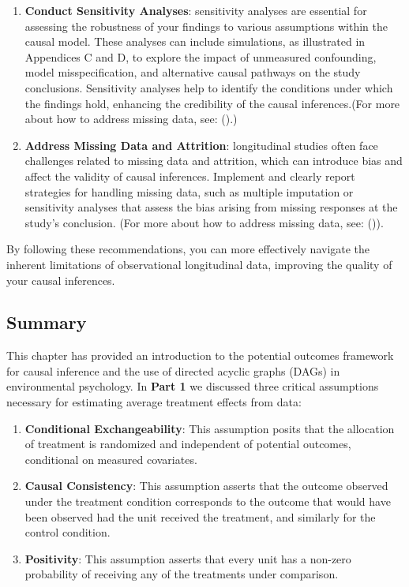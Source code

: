 \documentclass[
  singlecolumn]{article}
\providecommand{\tightlist}{%
  \setlength{\itemsep}{0pt}\setlength{\parskip}{0pt}}\usepackage{longtable,booktabs,array}
\begin{document}
\begin{enumerate}
\item
  \textbf{Conduct Sensitivity Analyses}: sensitivity analyses are
  essential for assessing the robustness of your findings to various
  assumptions within the causal model. These analyses can include
  simulations, as illustrated in Appendices C and D, to explore the
  impact of unmeasured confounding, model misspecification, and
  alternative causal pathways on the study conclusions. Sensitivity
  analyses help to identify the conditions under which the findings
  hold, enhancing the credibility of the causal inferences.(For more
  about how to address missing data, see:
  ().)
\item
  \textbf{Address Missing Data and Attrition}: longitudinal studies
  often face challenges related to missing data and attrition, which can
  introduce bias and affect the validity of causal inferences. Implement
  and clearly report strategies for handling missing data, such as
  multiple imputation or sensitivity analyses that assess the bias
  arising from missing responses at the study's conclusion. (For more
  about how to address missing data, see:
  ()).
\end{enumerate}

By following these recommendations, you can more effectively navigate
the inherent limitations of observational longitudinal data, improving
the quality of your causal inferences.

\subsection{Summary}\label{summary}

This chapter has provided an introduction to the potential outcomes
framework for causal inference and the use of directed acyclic graphs
(DAGs) in environmental psychology. In \textbf{Part 1} we discussed
three critical assumptions necessary for estimating average treatment
effects from data:

\begin{enumerate}
\def\labelenumi{\arabic{enumi}.}
\tightlist
\item
  \textbf{Conditional Exchangeability}: This assumption posits that the
  allocation of treatment is randomized and independent of potential
  outcomes, conditional on measured covariates.
\item
  \textbf{Causal Consistency}: This assumption asserts that the outcome
  observed under the treatment condition corresponds to the outcome that
  would have been observed had the unit received the treatment, and
  similarly for the control condition.
\item
  \textbf{Positivity}: This assumption asserts that every unit has a
  non-zero probability of receiving any of the treatments under
  comparison.
\end{enumerate}
\end{document}
